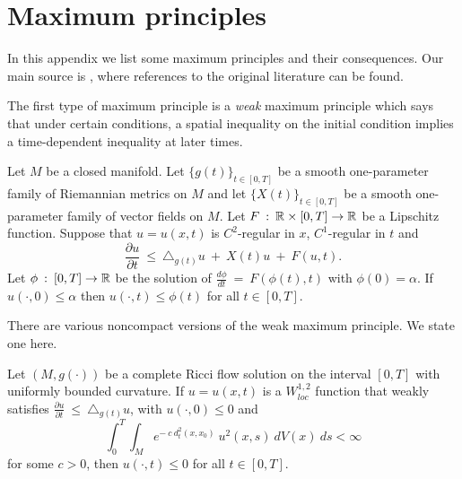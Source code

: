 
\section{Maximum principles} \label{maxprin}

In this appendix we list some maximum principles and their
consequences.  Our main source is \cite{Chow-Lu-Ni}, where
references to the original literature can be found.

The first type of maximum principle is a {\em weak} maximum
principle which says that under certain conditions, a spatial inequality
on the initial condition implies a time-dependent inequality at later times.

\begin{theorem}
  \label{thm:kl-maximum-principles-maximum-principles-theorem}

Let $M$ be a closed manifold. Let $\{g(t)\}_{t \in [0,T]}$ be a smooth
one-parameter family of Riemannian metrics on $M$ and let
$\{X(t)\}_{t \in [0, T]}$ be
a smooth one-parameter family of vector fields on $M$. Let $F \: : \:
{\mathbb R} \times [0, T] \rightarrow {\mathbb R}$ be a Lipschitz function.  Suppose that
$u=u(x,t)$ is $C^2$-regular in $x$, $C^1$-regular in $t$ and
\begin{equation}
\frac{\partial u}{\partial t} \: \le \: \triangle_{g(t)} u \: + \: X(t) u \: + \: F(u, t).
\end{equation}
Let $\phi \: : \: [0,T] \rightarrow {\mathbb R}$ be the solution of
$\frac{d\phi}{dt} \: = \: F(\phi(t), t)$ with $\phi(0) = \alpha$. If
$u(\cdot, 0) \le \alpha$ then $u(\cdot, t) \le \phi(t)$ for all $t \in [0, T]$.
\end{theorem}

There are various noncompact versions of the weak maximum principle.
We state one here.

\begin{theorem}
  \label{thm:kl-maximum-principles-estimates-curvature}

Let $(M, g(\cdot))$ be a complete Ricci flow solution on the interval
$[0,T]$ with uniformly bounded curvature.  If $u=u(x,t)$ is a
$W^{1,2}_{loc}$ function that weakly satisfies
$\frac{\partial u}{\partial t} \: \le \: \triangle_{g(t)} u$, with
$u(\cdot, 0) \le 0$ and
\begin{equation}
\int_0^T \int_M e^{- \: c \: d_t^2(x, x_0)} \: u^2(x,s) \: dV(x) \: ds < \infty
\end{equation}
for some $c > 0$, then $u(\cdot,t) \le 0$ for all $t \in [0,T]$.
\end{theorem}

